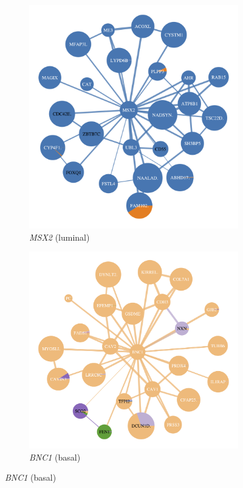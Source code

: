 \begin{figure}[H]
    \captionsetup[subfigure]{justification=Centering}
\centering
\begin{subfigure}[!t]{0.49\textwidth}
    \includegraphics[width=1.0\textwidth,height=1.0\textheight,keepaspectratio]{Sections/Network_I/Resources/selective_pruning/net/net_MSX2.png}
    \caption{\textit{MSX2} (luminal)}
    
    \label{fig:N_I:net_MSX2}
\end{subfigure}
\centering
\begin{subfigure}[!t]{0.49\textwidth}
    \includegraphics[width=1.0\textwidth,height=1.0\textheight,keepaspectratio]{Sections/Network_I/Resources/selective_pruning/net/net_BNC1.png}
    \caption{\textit{BNC1} (basal)}
    \label{fig:N_I:net_BNC1}
\end{subfigure}


\end{figure}
